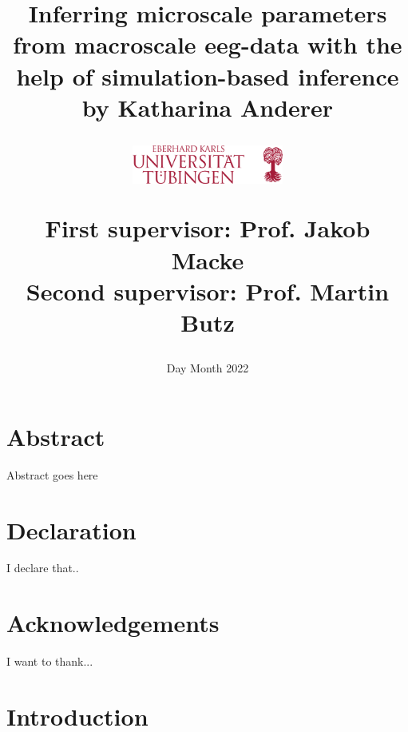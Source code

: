 \documentclass[12pt]{report}
\title{
{Inferring microscale parameters from macroscale eeg-data with the help of simulation-based inference}\\
\vspace{20px}
{\large by Katharina Anderer}
\vspace{40px}

\hspace{10px}\includegraphics[width=50mm,scale=0.5]{images/UniversitaetTuebingen.png}

\vspace{30px}
{\large First supervisor: Prof. Jakob Macke}\\
{\large Second supervisor: Prof. Martin Butz}
}
\date{Day Month 2022}
\begin{document}
\maketitle


\chapter*{Abstract}
Abstract goes here


\chapter*{Declaration}
I declare that..

\chapter*{Acknowledgements}
I want to thank...

\tableofcontents

\chapter*{Introduction}
\end{document}
